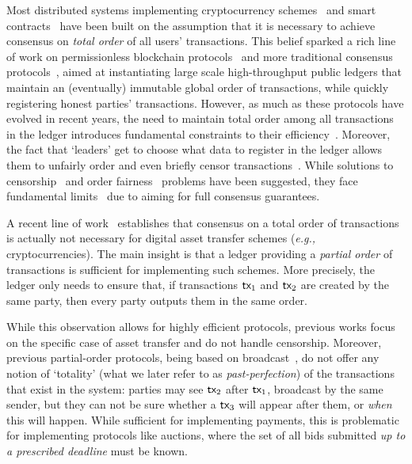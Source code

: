 \iffalse
Most distributed systems implementing cryptocurrency schemes~\cite{bitcoin} and smart contracts~\cite{smartcontracts,wood} have been built on the assumption that it is necessary to achieve consensus on \emph{total order} of all users' transactions. This belief sparked a rich line of work on permissionless blockchain protocols~\cite{EC:GarKiaLeo15,C:KRDO17,EC:DGKR18,EC:PasShi18,algorand} and more traditional consensus protocols~\cite{CCS:MXCSS16,PODC:YMRGA19,SP:AMNRY20,sbft,narwhal}, aimed at instantiating large scale high-throughput public ledgers that maintain an (eventually) immutable global order of transactions, while quickly registering honest parties' transactions. However, as much as these protocols have evolved in recent years, the need to maintain total order among all transactions in the ledger introduces fundamental constraints to their efficiency~\cite{antoniadis_et_al:LIPIcs.DISC.2018.7,FOCS:BerGarPer89,10.1007/978-3-319-39028-4_9}. Moreover, the fact that `leaders' get to choose what data to register in the ledger allows them to unfairly order and even briefly censor transactions~\cite{C:KZGJ20}. While solutions to censorship~\cite{DBLP:journals/corr/abs-2307-10185} and order fairness~\cite{CCS:KDLJK23,fairpos} problems have been suggested, they face fundamental limits~\cite{EC:KiaLeoShe24} due to aiming for full consensus guarantees.
\pagebreak

A recent line of work~\cite{DBLP:journals/corr/abs-1909-10926, DBLP:conf/dsn/CollinsGKKMPPST20,DBLP:conf/aft/BaudetDS20,DBLP:journals/dc/GuerraouiKMPS22} establishes that consensus on a total order of transactions is actually not necessary for digital asset transfer schemes (\textit{e.g.,} cryptocurrencies). The main insight is that a ledger providing a \emph{partial order} of transactions is sufficient for implementing such schemes. More precisely, the ledger only needs to ensure that, if transactions $\textsf{tx}_1$ and $\textsf{tx}_2$ are created by the same party, then every party outputs them in the same order.

While this observation allows for highly efficient protocols, previous works focus on the specific case of asset transfer and do not handle censorship.
Moreover, previous partial-order protocols, being based on broadcast~\cite{DBLP:journals/iandc/Bracha87}, do not offer any notion of `totality' (what we later refer to as \emph{past-perfection}) of the transactions that exist in the system: parties may see $\textsf{tx}_2$ after $\textsf{tx}_1$, broadcast by the same sender, but they can not be sure whether a $\textsf{tx}_3$ will appear after them, or \emph{when} this will happen. While sufficient for implementing payments, this is problematic for implementing protocols like auctions, where the set of all bids submitted \emph{up to a prescribed deadline} must be known.


